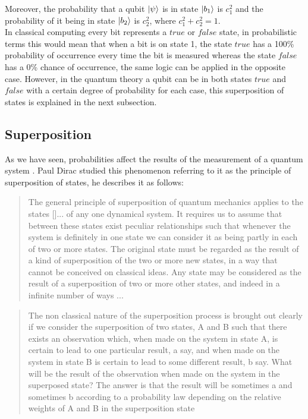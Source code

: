 \documentclass[12pt,a4paper]{scrartcl}
\begin{document}
Moreover, the probability that a qubit $\ket{\psi}$ is in state $\ket{b_1}$ is $c_1^2$ and the probability of it being in state $\ket{b_2}$ is $c_2^2$, where $c_1^2 + c_2^2 = 1$. \\

In classical computing every bit represents a $true$ or $false$ state, in probabilistic terms this would mean that when a bit is on state 1, the state $true$ has a 100\% probability of occurrence every time the bit is measured whereas the state $false$ has a 0\% chance of occurrence, the same logic can be applied in the opposite case. However, in the quantum theory a qubit can be in both states $true$ and $false$ with a certain degree of probability for each case, this superposition of states is explained in the next subsection. 

\subsection{Superposition}

As we have seen, probabilities affect the results of the measurement of a quantum system \cite{AllanAdams2013}.  Paul Dirac studied this phenomenon referring to it as the principle of superposition of states, he describes it as follows:

\begin{quote}
    The general principle of superposition of quantum mechanics applies to the states []... of any one dynamical system. It requires us to assume that between these states exist peculiar relationships such that whenever the system is definitely in one state we can consider it as being partly in each of two or more states. The original state must be regarded as the result of a kind of superposition of the two or more new states, in a way that cannot be conceived on classical ideas. Any state may be considered as the result of a superposition of two or more other states, and indeed in a infinite number of ways \cite{Dirac1967}...
\end{quote}
\begin{quote}
The non classical nature of the superposition process is brought out clearly if we consider the superposition of two states, A and B such that there exists an observation which, when made on the system in state A, is certain to lead to one particular result, a say, and when made on the system in state B is certain to lead to some different result, b say. What will be the result of the observation when made on the system in the superposed state? The answer is that the result will be sometimes a and sometimes b according to a probability law depending on the relative weights of A and B in the superposition state \cite{Dirac1967}
\end{quote}
\end{document}
